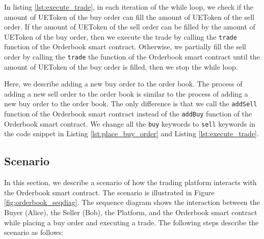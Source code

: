 In listing \ref{lst:execute_trade}, in each iteration of the while loop, we check if the amount of UEToken of the buy order can fill the amount of UEToken of the sell order. If the amount of UEToken of the sell order can be filled by the amount of UEToken of the buy order, then we execute the
trade by calling the \texttt{trade} function of the Orderbook smart contract. Otherwise, we partially fill the sell order by calling the \texttt{trade}
the function of the Orderbook smart contract until the amount of UEToken of the buy order is filled, then we stop the while loop.


Here, we describe adding a new buy order to the order book. The process of adding a new sell order to the order book is similar to the
process of adding a new buy order to the order book. The only difference is that we call the \texttt{addSell} function of the Orderbook smart contract
instead of the \texttt{addBuy} function of the Orderbook smart contract. We change all the \texttt{buy} keywords to \texttt{sell} keywords in the code
snippet in Listing \ref{lst:place_buy_order} and Listing \ref{lst:execute_trade}.


\subsection{Scenario}


In this section, we describe a scenario of how the trading platform interacts with the Orderbook smart contract. The scenario is illustrated in Figure
\ref{fig:orderbook_seqdiag}. The sequence diagram shows the interaction between the Buyer (Alice), the Seller (Bob), the Platform, and
the Orderbook smart contract while placing a buy order and executing a trade. The following steps describe the scenario as follows:


